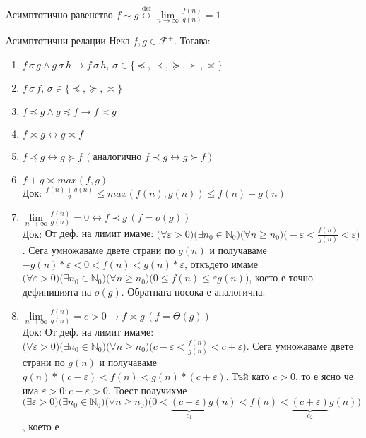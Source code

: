 \begin{boxnotation}{Асимптотично равенство}{}
	$f\sim g\overset{\text{def}}\leftrightarrow\lim\limits_{n\to\infty}\frac{f(n)}{g(n)}=1$
\end{boxnotation}

\begin{boxmainproperties}{Асимптотични релации}{}\label{mprop-1}
Нека $f,g\in\mathscr{F}^+$. Тогава:
	\begin{enumerate}
		\item $f\,\sigma\,g\land g\,\sigma\,h\rightarrow f\,\sigma\,h,\,\sigma\in\{\preccurlyeq,\prec,\succcurlyeq,\succ,\asymp\}$
		\item $f\,\sigma\,f,\,\sigma\in\{\preccurlyeq,\succcurlyeq,\asymp\}$
		\item $f\preccurlyeq g\land g\preccurlyeq f\rightarrow f\asymp g$
		\item $f\asymp g\leftrightarrow g\asymp f$
		\item $f\preccurlyeq g\leftrightarrow g\succcurlyeq f\,(\text{аналогично }f\prec g\leftrightarrow g\succ f)$
		\item $f+g\asymp max(f,g)$\\
			  $\textbf{Док: }\frac{f(n)+g(n)}2\le max(f(n),g(n))\le f(n)+g(n)$
		\item $\lim\limits_{n\to\infty}\frac{f(n)}{g(n)}=0\leftrightarrow f\prec g\,(f=o(g))$\\
			  $\textbf{Док:}$ От деф. на лимит имаме: $\big(\forall\varepsilon>0\big)\big(\exists n_0\in\mathbb{N}_0\big)\big(\forall n\ge n_0\big)\big(-\varepsilon<\frac{f(n)}{g(n)}<\varepsilon\big)$. Сега умножаваме двете страни по $g(n)$ и получаваме $-g(n)*\varepsilon<0<f(n)<g(n)*\varepsilon$, откъдето имаме $\big(\forall\varepsilon>0\big)\big(\exists n_0\in\mathbb{N}_0\big)\big(\forall n\ge n_0\big)\big(0\le f(n)\le\varepsilon g(n)\big)$, което е точно дефиницията на $\hyperref[bdef-asymp-classes]{o(g)}$. Обратната посока е аналогична.
		\item $\lim\limits_{n\to\infty}\frac{f(n)}{g(n)}=c>0\rightarrow f\asymp g\,(f=\Theta(g))$\\
			  $\textbf{Док:}$ От деф. на лимит имаме: $\big(\forall\varepsilon>0\big)\big(\exists n_0\in\mathbb{N}_0\big)\big(\forall n\ge n_0\big)\big(c-\varepsilon<\frac{f(n)}{g(n)}<c+\varepsilon\big)$. Сега умножаваме двете страни по $g(n)$ и получаваме $g(n)*(c-\varepsilon)<f(n)<g(n)*(c+\varepsilon)$. Тъй като $c>0$, то е ясно че има $\varepsilon>0:c-\varepsilon>0$. Тоест получихме $\big(\exists\varepsilon>0\big)\big(\exists n_0\in\mathbb{N}_0\big)\big(\forall n\ge n_0\big)\big(0<\underbrace{(c-\varepsilon)}_{c_1}g(n)<f(n)<\underbrace{(c+\varepsilon)}_{c_2}g(n)\big)$, което е
			  \vspace{-0.72cm}%
			  

\end{enumerate}
\end{boxmainproperties}
